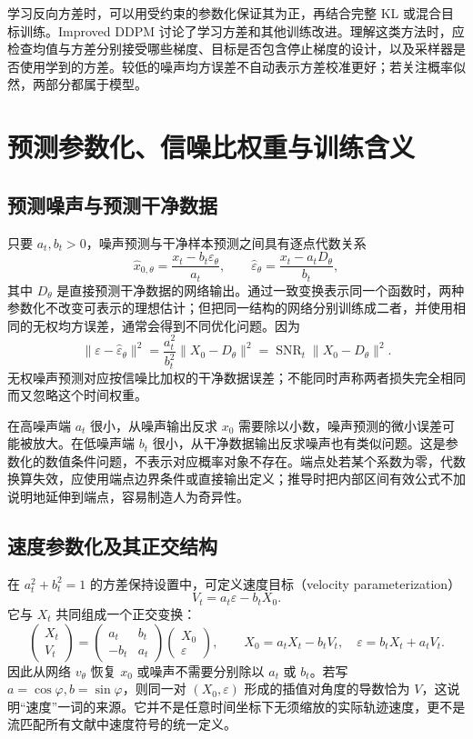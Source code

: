 \documentclass[UTF8,12pt,a4paper,fontset=fandol]{ctexart}
\begin{document}
学习反向方差时，可以用受约束的参数化保证其为正，再结合完整 KL 或混合目标训练。Improved DDPM 讨论了学习方差和其他训练改进\cite{nichol2021}。理解这类方法时，应检查均值与方差分别接受哪些梯度、目标是否包含停止梯度的设计，以及采样器是否使用学到的方差。较低的噪声均方误差不自动表示方差校准更好；若关注概率似然，两部分都属于模型。

\section{预测参数化、信噪比权重与训练含义}
\label{sec:diff-parameterization}
\subsection{预测噪声与预测干净数据}
只要 $a_t,b_t>0$，噪声预测与干净样本预测之间具有逐点代数关系
\begin{equation}
 \widehat x_{0,\theta}=\frac{x_t-b_t\varepsilon_\theta}{a_t},\qquad
 \widehat\varepsilon_\theta=\frac{x_t-a_tD_\theta}{b_t},
 \label{eq:diff-x-eps-convert}
\end{equation}
其中 $D_\theta$ 是直接预测干净数据的网络输出。通过一致变换表示同一个函数时，两种参数化不改变可表示的理想估计；但把同一结构的网络分别训练成二者，并使用相同的无权均方误差，通常会得到不同优化问题。因为
\[
 \|\varepsilon-\widehat\varepsilon_\theta\|^2
 =\frac{a_t^2}{b_t^2}\|X_0-D_\theta\|^2
 =\operatorname{SNR}_t\|X_0-D_\theta\|^2.
\]
无权噪声预测对应按信噪比加权的干净数据误差；不能同时声称两者损失完全相同而又忽略这个时间权重。

在高噪声端 $a_t$ 很小，从噪声输出反求 $x_0$ 需要除以小数，噪声预测的微小误差可能被放大。在低噪声端 $b_t$ 很小，从干净数据输出反求噪声也有类似问题。这是参数化的数值条件问题，不表示对应概率对象不存在。端点处若某个系数为零，代数换算失效，应使用端点边界条件或直接输出定义；推导时把内部区间有效公式不加说明地延伸到端点，容易制造人为奇异性。

\subsection{速度参数化及其正交结构}
在 $a_t^2+b_t^2=1$ 的方差保持设置中，可定义速度目标（velocity parameterization）
\begin{equation}
 V_t=a_t\varepsilon-b_tX_0.
 \label{eq:diff-v-target}
\end{equation}
它与 $X_t$ 共同组成一个正交变换：
\[
 \begin{pmatrix}X_t\\V_t\end{pmatrix}
 =\begin{pmatrix}a_t&b_t\\-b_t&a_t\end{pmatrix}
 \begin{pmatrix}X_0\\\varepsilon\end{pmatrix},\qquad
 X_0=a_tX_t-b_tV_t,\quad\varepsilon=b_tX_t+a_tV_t.
\]
因此从网络 $v_\theta$ 恢复 $x_0$ 或噪声不需要分别除以 $a_t$ 或 $b_t$。若写 $a=\cos\varphi,b=\sin\varphi$，则同一对 $(X_0,\varepsilon)$ 形成的插值对角度的导数恰为 $V$，这说明“速度”一词的来源。它并不是任意时间坐标下无须缩放的实际轨迹速度，更不是流匹配所有文献中速度符号的统一定义。
\end{document}
